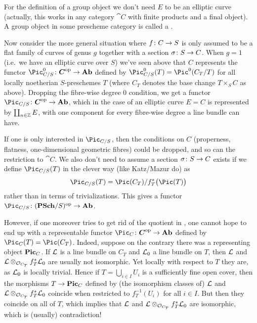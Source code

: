 \documentclass[a4paper,parskip=half,numbers=enddot, DIV=12]{scrreprt}
\begin{document}
	For the definition of a group object we don't need $E$ to be an elliptic curve (actually, this works in any category $\cat C$ with finite products and a final object). A group object in some prescheme category is called a .
	
Now consider the more general situation where $f\colon C\morphism S$ is only assumed to be a flat family of curves of genus $g$ together with a section $\sigma\colon S\morphism C$. When $g=1$ (i.e.\ we have an elliptic curve over $S$) we've seen above that $C$ represents the functor $\Pic_{C/S}^{0}\colon \cat{C}^\op\morphism\cat{Ab}$ defined by $\Pic_{C/S}^0(T)=\Pic^0(C_T/T)$ for all locally noetherian $S$-preschemes $T$ (where $C_T$ denotes the base change $T\times_SC$ as above). Dropping the fibre-wise degree $0$ condition, we get a functor $\Pic_{C/S}\colon \cat{C}^\op\morphism\cat{Ab}$, which in the case of an elliptic curve $E=C$ is represented by $\coprod_{n\in\mathbb{Z}}E$, with one component for every fibre-wise degree a line bundle can have.

If one is only interested in $\Pic_{C/S}$, then the conditions on $C$ (properness, flatness, one-dimensional geometric fibres) could be dropped, and so can the restriction to $\cat{C}$. We also don't need to assume a section $\sigma\colon S\morphism C$ exists if we define $\Pic_{C/S}(T)$ in the clever way (like Katz/Mazur do) as
\begin{align}\lbl{eq:PicCS}
	\Pic_{C/S}(T)=\Pic(C_T)/f_T^*\big(\Pic(T)\big)
\end{align}
rather than in terms of trivializations. This gives a functor $\Pic_{C/S}\colon (\cat{PSch}/S)^\op\morphism\cat{Ab}$.

However, if one moreover tries to get rid of the quotient in , one cannot hope to end up with a representable functor $\Pic_C\colon\cat{C}^\op\morphism\cat{Ab}$ defined by $\Pic_C(T)=\Pic(C_T)$. Indeed, suppose on the contrary there was a representing object $\mathbf{Pic}_C$. If $\mathcal{L}$ is a line bundle on $C_T$ and $\mathcal{L}_0$ a line bundle on $T$, then $\mathcal{L}$ and $\mathcal{L}\otimes_{\mathcal{O}_{C_T}}f_T^*\mathcal{L}_0$ are usually not isomorphic. Yet locally with respect to $T$ they are, as $\mathcal{L}_0$ is locally trivial. Hence if $T=\bigcup_{i\in I}U_i$ is a sufficiently fine open cover, then the morphisms $T\morphism\PIC_C$ defined by (the isomorphism classes of) $\mathcal{L}$ and $\mathcal{L}\otimes_{\mathcal{O}_{C_T}}f_T^*\mathcal{L}_0$ coincide when restricted to $f_T^{-1}(U_i)$ for all $i\in I$. But then they coincide on all of $T$, which implies that $\mathcal{L}$ and $\mathcal{L}\otimes_{\mathcal{O}_{C_T}}f_T^*\mathcal{L}_0$ are isomorphic, which is (usually) contradiction!
\end{document}
